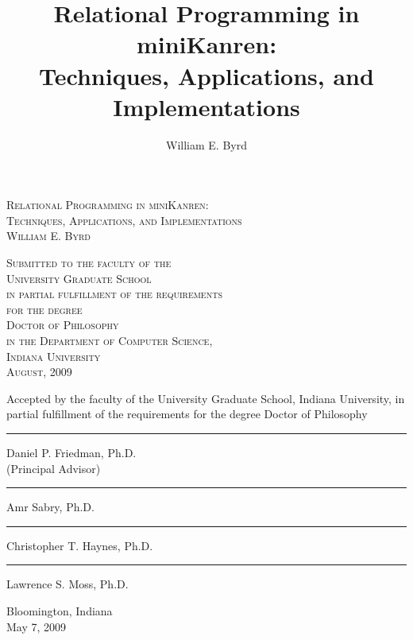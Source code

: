 \documentclass[onecolumn, 11pt, oneside, openright]{book}
\newcommand{\thesisauthor}[0]{William E. Byrd}
\newcommand{\thesistitle}[0]{Relational Programming in miniKanren: \\ Techniques, Applications, and Implementations}
\newcommand{\thesismonth}[0]{August}
\newcommand{\thesisyear}[0]{2009}
\newcommand{\thesisdate}[0]{May 7, 2009}
\newcommand{\thesiscommitteemembers}[0]{%
\cmember{Daniel P. Friedman, Ph.D. \\ (Principal Advisor)}
\cmember{Amr Sabry, Ph.D.}
\cmember{Christopher T. Haynes, Ph.D.}
\cmember{Lawrence S. Moss, Ph.D.}
}
\begin{document}
\frontmatter

\title{\thesistitle{}}

\author{\thesisauthor{}}

\thispagestyle{empty}

\mbox{}
\vspace{1in}


\begin{center}
{ 
  \fontsize{24}{24}
  \noindent \scshape \thesistitle{} \\
}
\vspace{2in}
{\fontsize{16}{16} %
\scshape \thesisauthor{}}

\vspace{1in}
{ \fontsize{14}{14} %
\scshape
  Submitted to the faculty of the \\
  University Graduate School \\
  in partial fulfillment of the requirements \\
  for the degree \\
  Doctor of Philosophy \\
  in the Department of Computer Science, \\
  Indiana University \\
  \vspace{.5in}
  \thesismonth{}, \thesisyear{}}
\end{center}

\newpage

\newcommand{\cmember}[1]{

\vspace{1in}
\hfill 
\begin{minipage}{3.5in}
\begin{center}
\rule{3.5in}{1pt}
#1 
\end{center}
\end{minipage}
}

{
  \fontsize{12}{12}
\noindent Accepted by the faculty of the University Graduate School,
Indiana University, in partial fulfillment of the requirements for the
degree Doctor of Philosophy\vspace{.5in}

\thesiscommitteemembers{}

\vfill{}
\noindent Bloomington, Indiana\\
\thesisdate{}
}

\newpage
\end{document}
